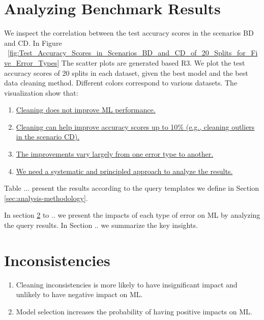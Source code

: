 \section{Analyzing Benchmark Results}
We inspect the correlation between the test accuracy scores in
the scenarios BD and CD. In Figure ~\ref{fig:Test_Accuracy_Scores_in_Scenarios_BD_and_CD_of_20_Splits_for_Five_Error_Types}
The scatter plots are generated based R3. We plot the test accuracy scores of 20 splits in each
dataset, given the best model and the best data cleaning method. Different colors correspond to various datasets. The visualization show that: 
\begin{enumerate}
	\item{
		\underline{Cleaning does not improve ML performance.}
	}
	\item {
		\underline{Cleaning can help improve accuracy scores up to 10\% (e.g., cleaning outliers in the scenario CD).}
	}
	\item {
		\underline{The improvements vary largely from one error type to another.}
	}
	\item {
		\underline{We need a systematic and principled approach to analyze the results.}
	}
\end{enumerate}

Table ... present the results according to the query templates we define in Section \ref{sec:analysis-methodology}.

In section \ref{sec:inconsistencies} to .. we present the impacts of each type of error on ML by analyzing the query results. 
In Section .. we summarize the key insights. 

\section{Inconsistencies} \label{sec:inconsistencies}

\begin{enumerate}
	\item {
		Cleaning inconsistencies is more likely to have insignificant impact and unlikely to have negative impact on ML.
	}
	\item {
		Model selection increases the probability of having positive impacts on ML.
	}
\end{enumerate}

